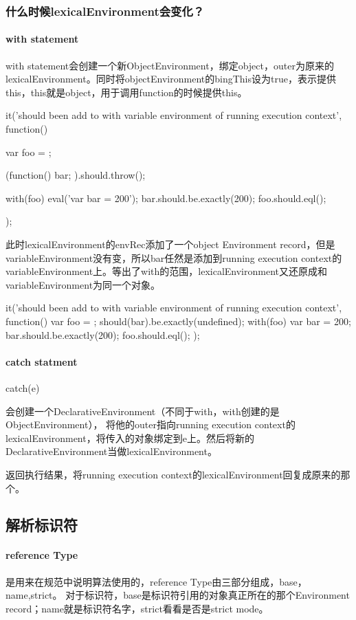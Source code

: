 \subsubsection{什么时候lexicalEnvironment会变化？}
\paragraph{with statement}
with statement会创建一个新ObjectEnvironment，绑定object，outer为原来的lexicalEnvironment。同时将objectEnvironment的bingThis设为true，表示提供this，this就是object，用于调用function的时候提供this。
\begin{JavaScript}
		it('should been add to with variable environment of running execution context', function(){
			var foo = {};

			(function(){
				bar;
			}).should.throw();
			
			with(foo){
				eval('var bar = 200');
			}
			bar.should.be.exactly(200);
			foo.should.eql({});
		});
\end{JavaScript}

此时lexicalEnvironment的envRec添加了一个object Environment record，但是variableEnvironment没有变，所以bar任然是添加到running execution context的variableEnvironment上。等出了with的范围，lexicalEnvironment又还原成和variableEnvironment为同一个对象。
\begin{JavaScript}
		it('should been add to with variable environment of running execution context', function(){
			var foo = {};
			should(bar).be.exactly(undefined);
			with(foo){
				var bar = 200;
			}
			bar.should.be.exactly(200);
			foo.should.eql({});
		});
\end{JavaScript}

\paragraph{catch statment}
catch(e)

会创建一个DeclarativeEnvironment（不同于with，with创建的是ObjectEnvironment）， 将他的outer指向running execution context的lexicalEnvironment，将传入的对象绑定到e上。然后将新的DeclarativeEnvironment当做lexicalEnvironment。

返回执行结果，将running execution context的lexicalEnvironment回复成原来的那个。
\subsection{解析标识符}
\paragraph{reference Type} 是用来在规范中说明算法使用的，reference Type由三部分组成，base，name,strict。
对于标识符，base是标识符引用的对象真正所在的那个Environment record；name就是标识符名字，strict看看是否是strict mode。

